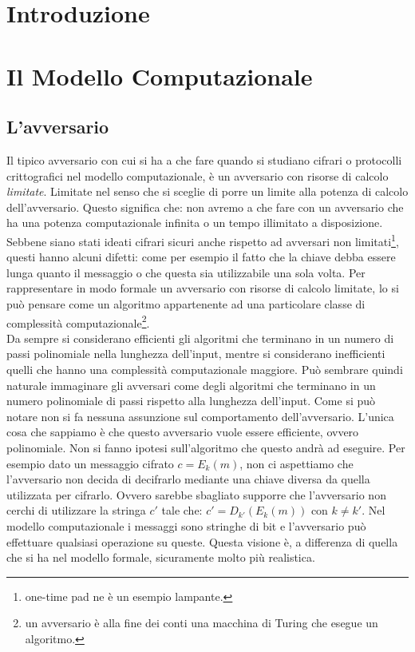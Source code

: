 \documentclass[a4paper,openright,twoside,12pt]{report}
\author{Gian Pietro Farina}
\begin{document}
\chapter*{Introduzione}
\clearpage{\pagestyle{empty}\cleardoublepage}
\chapter{Il Modello Computazionale}
\section{L'avversario}
Il tipico avversario con cui si ha a che fare quando si studiano cifrari o protocolli crittografici nel modello computazionale,
è un avversario con risorse di calcolo \emph{limitate}. Limitate nel senso che si sceglie di porre un limite alla potenza di calcolo dell'avversario.
Questo significa che: non avremo a che fare con un avversario che ha una potenza computazionale infinita o un tempo illimitato a disposizione.
Sebbene siano stati ideati cifrari sicuri anche rispetto ad avversari non limitati\footnote{one-time pad ne \`e un esempio lampante.}, questi hanno alcuni difetti: come per esempio
il fatto che la chiave debba essere lunga quanto il messaggio o che questa sia utilizzabile una sola volta.
Per rappresentare in modo formale un avversario con risorse di calcolo limitate, lo si può pensare come un algoritmo appartenente ad una 
particolare classe di complessit\`a computazionale\footnote{un avversario \`e alla fine dei conti una macchina di Turing che esegue un algoritmo.}. \\
Da sempre si considerano efficienti gli algoritmi che terminano in un numero di passi polinomiale nella lunghezza dell'input, mentre si considerano inefficienti 
quelli che hanno una complessit\`a computazionale maggiore. Pu\`o sembrare quindi naturale immaginare gli avversari come degli algoritmi che terminano in un numero polinomiale di passi
rispetto alla lunghezza dell'input. Come si pu\`o notare non si fa nessuna assunzione sul comportamento dell'avversario. L'unica cosa che sappiamo \`e che questo avversario vuole essere efficiente, ovvero polinomiale. Non si fanno ipotesi sull'algoritmo che questo andr\`a ad eseguire.
Per esempio dato un messaggio cifrato $c=E_k(m)$, non ci aspettiamo che l'avversario non decida di decifrarlo mediante
una chiave diversa da quella utilizzata per cifrarlo. Ovvero sarebbe sbagliato supporre che l'avversario non cerchi di utilizzare la stringa $c'$ tale che:  $c'=D_{k'}(E_k(m))$ con $k\neq k'$.
Nel modello computazionale i messaggi sono stringhe di bit e l'avversario pu\`o effettuare qualsiasi operazione su queste. Questa visione \`e, a differenza di quella 
che si ha nel modello formale, sicuramente molto pi\`u realistica.\\
\end{document}
